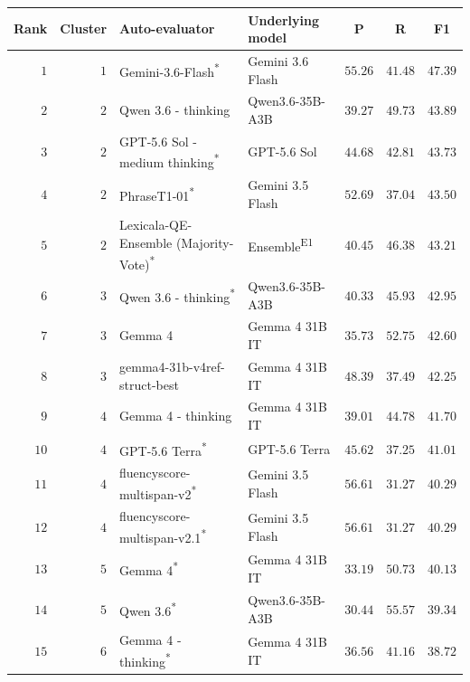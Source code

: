 \begin{table}[t]
\centering
\small
\begin{tabular}{rrllrrr}
\toprule
\multicolumn{1}{c}{Rank} & \multicolumn{1}{c}{Cluster} & Auto-evaluator & Underlying model & \multicolumn{1}{c}{P} & \multicolumn{1}{c}{R} & \multicolumn{1}{c}{F1} \\
\midrule
\rowcolor{black!15} $1$ & $1$ & Gemini-3.6-Flash\textsuperscript{*} & Gemini 3.6 Flash & $55.26$ & $41.48$ & $47.39$ \\
\rowcolor{black!15} $2$ & $2$ & Qwen 3.6 - thinking & Qwen3.6-35B-A3B & $39.27$ & $49.73$ & $43.89$ \\
\rowcolor{black!15} $3$ & $2$ & GPT-5.6 Sol - medium thinking\textsuperscript{*} & GPT-5.6 Sol & $44.68$ & $42.81$ & $43.73$ \\
$4$ & $2$ & PhraseT1-01\textsuperscript{*} & Gemini 3.5 Flash & $52.69$ & $37.04$ & $43.50$ \\
$5$ & $2$ & Lexicala-QE-Ensemble (Majority-Vote)\textsuperscript{*} & Ensemble\textsuperscript{E1} & $40.45$ & $46.38$ & $43.21$ \\
\rowcolor{black!15} $6$ & $3$ & Qwen 3.6 - thinking\textsuperscript{*} & Qwen3.6-35B-A3B & $40.33$ & $45.93$ & $42.95$ \\
\rowcolor{black!15} $7$ & $3$ & Gemma 4 & Gemma 4 31B IT & $35.73$ & $52.75$ & $42.60$ \\
$8$ & $3$ & gemma4-31b-v4ref-struct-best & Gemma 4 31B IT & $48.39$ & $37.49$ & $42.25$ \\
\rowcolor{black!15} $9$ & $4$ & Gemma 4 - thinking & Gemma 4 31B IT & $39.01$ & $44.78$ & $41.70$ \\
\rowcolor{black!15} $10$ & $4$ & GPT-5.6 Terra\textsuperscript{*} & GPT-5.6 Terra & $45.62$ & $37.25$ & $41.01$ \\
$11$ & $4$ & fluencyscore-multispan-v2\textsuperscript{*} & Gemini 3.5 Flash & $56.61$ & $31.27$ & $40.29$ \\
$12$ & $4$ & fluencyscore-multispan-v2.1\textsuperscript{*} & Gemini 3.5 Flash & $56.61$ & $31.27$ & $40.29$ \\
\rowcolor{black!15} $13$ & $5$ & Gemma 4\textsuperscript{*} & Gemma 4 31B IT & $33.19$ & $50.73$ & $40.13$ \\
\rowcolor{black!15} $14$ & $5$ & Qwen 3.6\textsuperscript{*} & Qwen3.6-35B-A3B & $30.44$ & $55.57$ & $39.34$ \\
\rowcolor{black!15} $15$ & $6$ & Gemma 4 - thinking\textsuperscript{*} & Gemma 4 31B IT & $36.56$ & $41.16$ & $38.72$ \\

\end{tabular}
\end{table}
